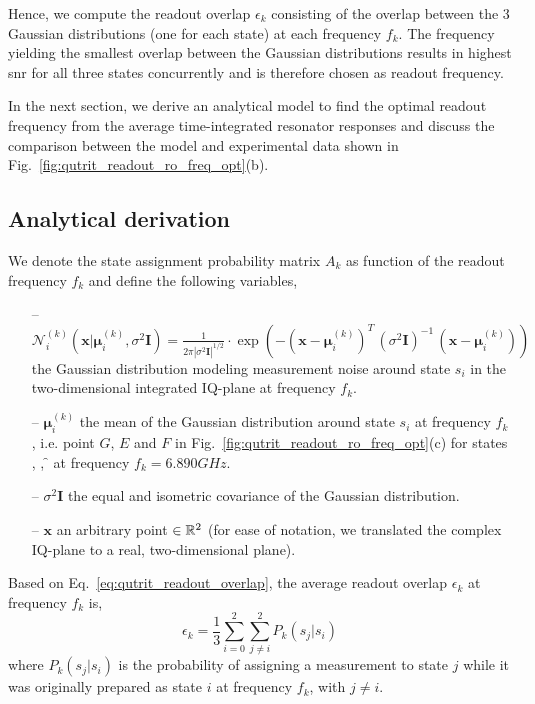 Hence,  we compute the readout overlap $\epsilon_k$ consisting of the overlap between the 3 Gaussian distributions (one for each state) at each frequency $f_k$. The frequency yielding the smallest overlap between the Gaussian distributions results in highest \gls{snr} for all three states concurrently and is therefore chosen as readout frequency.

In the next section, we derive an analytical model to find the optimal readout frequency from the average time-integrated resonator responses and discuss the comparison between the model and experimental data shown in Fig.~\ref{fig:qutrit_readout_ro_freq_opt}(b).
 
\subsection{Analytical derivation} \label{s:analytical_derivation_3_gaussians}
We denote the state assignment probability matrix $A_k$ as function of the readout frequency $f_k$ and define the following variables,
\begin{itemize}
    \item[--] $ \mathcal{N}_i^{(k)}(\bm{x}|\bm{\mu}_i^{(k)}, \sigma^2\bm{I}) = \frac{1}{2\pi| \sigma^2\bm{I}|^{1/2}} \cdot \exp\left(-(\bm{x}-\bm{\mu}_i^{(k)})^T\, (\sigma^2\bm{I})^{-1}\,(\bm{x}-\bm{\mu}_i^{(k)})\right)$ the Gaussian distribution modeling measurement noise around state $s_i$ in the two-dimensional integrated IQ-plane at frequency $f_k$.
    \item[--] $\bm{\mu}_i^{(k)}$ the mean of the Gaussian distribution around state $s_i$ at frequency $f_k$, i.e. point $G$, $E$ and $F$ in Fig.~\ref{fig:qutrit_readout_ro_freq_opt}(c) for states \g, \e, \f{} at frequency $f_k = 6.890 \unit{GHz}$.
    \item[--] $\sigma^2\bm{I}$ the equal and isometric covariance of the Gaussian distribution.
    \item[--] $\bm{x}$ an arbitrary point $\in \mathbb{R}^2$ (for ease of notation, we translated the complex IQ-plane to a real, two-dimensional plane).
\end{itemize}

Based on Eq.~\eqref{eq:qutrit_readout_overlap}, the average readout overlap $\epsilon_{k}$ at frequency $f_k$ is, 
\begin{equation}
\epsilon_{k}= \frac{1}{3}\sum_{i=0}^{2}{\sum_{j \neq i}^{2}{P_k(s_j | s_i)}}
\end{equation}
where $P_k(s_j|s_i)$ is the probability of assigning a measurement to state $j$ while it was originally prepared as state $i$ at frequency $f_k$, with $j\neq i$. 

